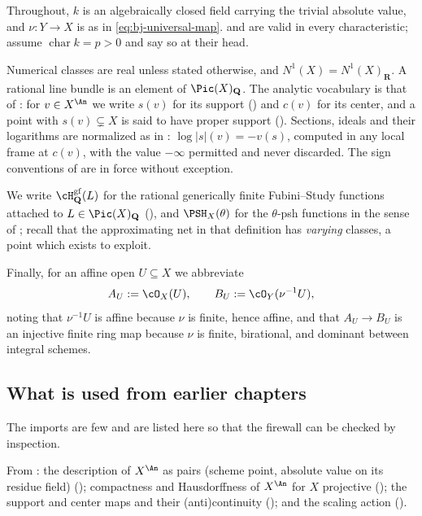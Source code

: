 Throughout, $k$ is an algebraically closed field carrying the trivial
absolute value, and $\nu:Y\to X$ is as in \eqref{eq:bj-universal-map}.
 and
 are valid in every characteristic;
 assume
$\operatorname{char}k=p>0$ and say so at their head.

Numerical classes are real unless stated otherwise, and
$N^1(X)=N^1(X)_{\mathbf R}$.  A rational line bundle is an element of
$\Pic(X)_{\mathbf Q}$.  The analytic vocabulary is that of
: for $v\in X^{\An}$ we write $s(v)$
for its support () and $c(v)$ for its center, and a
point with $s(v)\subsetneq X$ is said to have proper support
().  Sections, ideals and their logarithms are
normalized as in : $\log|s|(v)=-v(s)$, computed in
any local frame at $c(v)$, with the value $-\infty$ permitted and never
discarded.  The sign conventions of  are in force
without exception.

We write $\cH^{\mathrm{gf}}_{\mathbf Q}(L)$ for the rational generically
finite Fubini--Study functions attached to $L\in\Pic(X)_{\mathbf Q}$
(), and $\PSH_X(\theta)$ for the $\theta$-psh
functions in the sense of ; recall that the approximating
net in that definition has \emph{varying} classes, a point which
 exists to exploit.

Finally, for an affine open $U\subseteq X$ we abbreviate
\[
 A_U:=\cO_X(U),
 \qquad
 B_U:=\cO_Y(\nu^{-1}U),
\]
noting that $\nu^{-1}U$ is affine because $\nu$ is finite, hence affine,
and that $A_U\to B_U$ is an injective finite ring map because $\nu$ is
finite, birational, and dominant between integral schemes.

\subsection{What is used from earlier chapters}
\label{sec:ch43-dependencies}

The imports are few and are listed here so that the firewall can be checked
by inspection.

From : the description of $X^{\An}$ as
pairs (scheme point, absolute value on its residue field)
(); compactness and Hausdorffness of $X^{\An}$
for $X$ projective (); the
support and center maps and their (anti)continuity
(); and the scaling action
().


